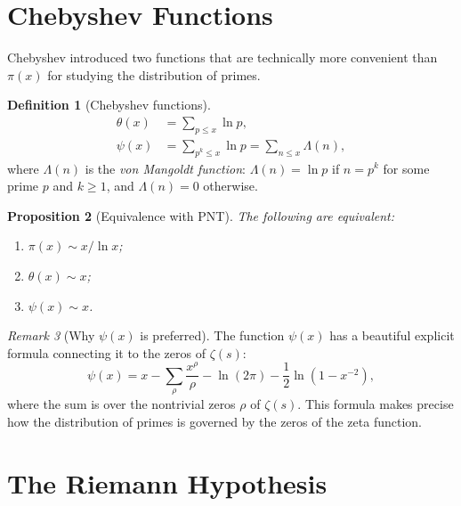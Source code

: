 \documentclass[12pt,a4paper,openany]{book}
\theoremstyle{definition}
\newtheorem{definition}{Definition}[chapter]
\theoremstyle{plain}
\newtheorem{proposition}[definition]{Proposition}
\theoremstyle{remark}
\newtheorem{remark}[definition]{Remark}
\begin{document}
\section{Chebyshev Functions}
\label{sec:chebyshev}

Chebyshev introduced two functions that are technically
more convenient than $\pi(x)$ for studying the distribution of primes.

\begin{definition}[Chebyshev functions]
\label{def:chebyshev}
\begin{align*}
  \theta(x) &= \sum_{p \leq x} \ln p, \\
  \psi(x)   &= \sum_{p^k \leq x} \ln p = \sum_{n \leq x} \Lambda(n),
\end{align*}
where $\Lambda(n)$ is the \emph{von Mangoldt
function}: $\Lambda(n) = \ln p$ if $n = p^k$ for some prime $p$ and $k \geq 1$,
and $\Lambda(n) = 0$ otherwise.
\end{definition}

\begin{proposition}[Equivalence with PNT]
\label{prop:chebyshev-PNT}
The following are equivalent:
\begin{enumerate}
  \item $\pi(x) \sim x/\ln x$;
  \item $\theta(x) \sim x$;
  \item $\psi(x) \sim x$.
\end{enumerate}
\end{proposition}

\begin{remark}[Why $\psi(x)$ is preferred]
\label{rem:psi-preferred}
The function $\psi(x)$ has a beautiful explicit formula connecting it to the
zeros of $\zeta(s)$:
\[
  \psi(x) = x - \sum_{\rho} \frac{x^\rho}{\rho} - \ln(2\pi) - \frac{1}{2}\ln(1-x^{-2}),
\]
where the sum is over the nontrivial zeros $\rho$ of $\zeta(s)$. This formula
makes precise how the distribution of primes is governed by the zeros of the
zeta function.
\end{remark}


\section{The Riemann Hypothesis}
\label{sec:RH}
\end{document}
